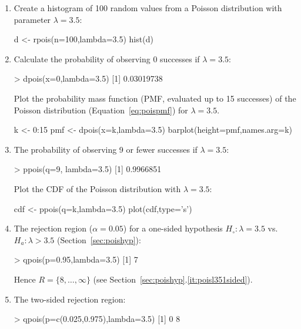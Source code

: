 \begin{enumerate}
\item Create a histogram of 100 random values from a Poisson
  distribution with parameter $\lambda=3.5$:

\begin{script}
d <- rpois(n=100,lambda=3.5)
hist(d)
\end{script}

\item Calculate the probability of observing 0 successes if $\lambda=3.5$:

\begin{console}
> dpois(x=0,lambda=3.5)
[1] 0.03019738
\end{console}

Plot the probability mass function (PMF, evaluated up to 15 successes)
of the Poisson distribution (Equation~\ref{eq:poispmf}) for
$\lambda=3.5$.

\begin{script}
k <- 0:15
pmf <- dpois(x=k,lambda=3.5)
barplot(height=pmf,names.arg=k)
\end{script}

\item The probability of observing 9 or fewer successes if $\lambda=3.5$:

\begin{console}
> ppois(q=9, lambda=3.5)
[1] 0.9966851
\end{console}

Plot the CDF of the Poisson distribution with $\lambda=3.5$:

\begin{script}
cdf <- ppois(q=k,lambda=3.5)
plot(cdf,type='s')
\end{script}

\item\label{it:1sidedpoisR} The rejection region ($\alpha=0.05$) for a
  one-sided hypothesis $H_\circ: \lambda=3.5$ vs.  $H_a: \lambda>3.5$
  (Section~\ref{sec:poishyp}):

\begin{console}
> qpois(p=0.95,lambda=3.5)
[1] 7
\end{console}

Hence $R=\{8,\ldots,\infty\}$ (see
Section~\ref{sec:poishyp}.\ref{it:poisl351sided}).

\item\label{it:2sidedpoisR} The two-sided rejection region:

\begin{console}
> qpois(p=c(0.025,0.975),lambda=3.5)
[1] 0 8
\end{console}


\end{enumerate}
